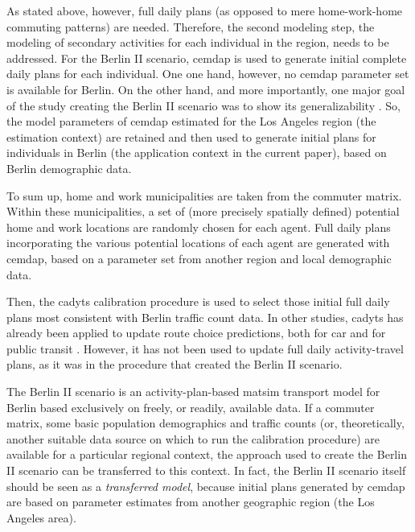 As stated above, however, full daily plans (as opposed to mere home-work-home commuting patterns) are needed. Therefore, the second modeling step, the modeling of secondary activities for each individual in the region, needs to be addressed. For the Berlin II scenario, \gls{cemdap} is used to generate initial complete daily plans for each individual. One one hand, however, no \gls{cemdap} parameter set is available for Berlin. On the other hand, and more importantly, one major goal of the study creating the Berlin II scenario was to show its generalizability \citep{ZiemkeNagelBhat2015IntegratingCemdapMatsimTransferabilityTRB}. So, the model parameters of \gls{cemdap} estimated for the Los Angeles region (the estimation context) are retained and then used to generate initial plans for individuals in Berlin (the application context in the current paper), based on Berlin demographic data.

To sum up, home and work municipalities are taken from the commuter matrix. Within these municipalities, a set of (more precisely spatially defined) potential home and work locations are randomly chosen for each agent. Full daily plans incorporating the various potential locations of each agent are generated with \gls{cemdap}, based on a parameter set from another region and local demographic data.

Then, the \gls{cadyts} calibration procedure is used to select those initial full daily plans most consistent with Berlin traffic count data. In other studies, \gls{cadyts} has already been applied to update route choice predictions, both for car \citep{FloetteroedChenEtAl2011BehavioralCalibAndAna} and for public transit \citep{MoyoNagel2013ptNetCalibrationABMTPO}. However, it has not been used to update full daily activity-travel plans, as it was in the procedure that created the Berlin II scenario. 

The Berlin II scenario is an activity-plan-based \gls{matsim} transport model for Berlin based exclusively on freely, or readily, available data. If a commuter matrix, some basic population demographics and traffic counts (or, theoretically, another suitable data source on which to run the calibration procedure) are available for a particular regional context, the approach used to create the Berlin II scenario can be transferred to this context. In fact, the Berlin II scenario itself should be seen as a \emph{transferred model}, because initial plans generated by \gls{cemdap} are based on parameter estimates from another geographic region (the Los Angeles area).

